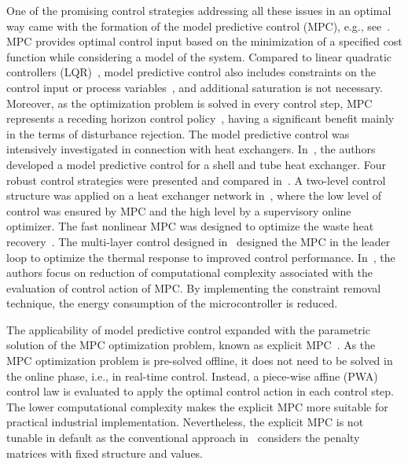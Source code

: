 \documentclass[preprint,12pt]{elsarticle}
\begin{document}
	One of the promising control strategies addressing all these issues in an optimal way came with the formation of the model predictive control (MPC), e.g., see~\cite{Morari_MPC}. MPC provides optimal control input based on the minimization of a specified cost function while considering a model of the system. Compared to linear quadratic controllers (LQR)~\cite{LQR}, model predictive control also includes constraints on the control input or process variables~\cite{Maciejowski_MPC}, and additional saturation is not necessary. Moreover, as the optimization problem is solved in every control step, MPC represents a receding horizon control policy~\cite{receding_horizon}, having a significant benefit mainly in the terms of disturbance rejection. The model predictive control was intensively investigated in connection with heat exchangers. In~\cite{Vinaya_HE_MPC}, the authors developed a model predictive control for a shell and tube heat exchanger. %
	Four robust control strategies were presented and compared in~\cite{Oravec_HE_ATE}. A two-level control structure was applied on a heat exchanger network in~\cite{Gonzales_HE_MPC}, where the low level of control was ensured by MPC and the high level by a supervisory online optimizer. The fast nonlinear MPC was designed to optimize the waste heat recovery~\cite{WC19}. The multi-layer control designed in~\cite{DZ18} designed the MPC in the leader loop to optimize the thermal response to improved control performance. In~\cite{DYRSKA_HE}, the authors focus on reduction of computational complexity associated with the evaluation of control action of MPC. By implementing the constraint removal technique, the energy consumption of the microcontroller is reduced.      
	
	The applicability of model predictive control expanded with the parametric solution of the MPC optimization problem, known as explicit MPC~\cite{Bemporad_automatica}. As the MPC optimization problem is pre-solved offline, it does not need to be solved in the online phase, i.e., in real-time control. Instead, a piece-wise affine (PWA) control law is evaluated to apply the optimal control action in each control step. The lower computational complexity makes the explicit MPC more suitable for practical industrial implementation. Nevertheless, the explicit MPC is not tunable in default as the conventional approach in~\cite{Bemporad_automatica} considers the penalty matrices with fixed structure and values.
	
\end{document}
